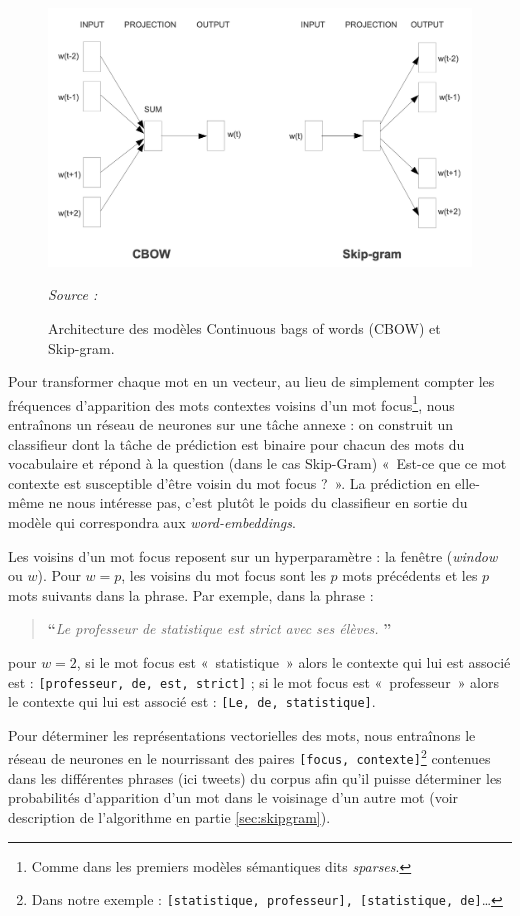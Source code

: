 \documentclass[11pt,french,french]{article}
\let\rmarkdownfootnote\footnote%
\def\footnote{\protect\rmarkdownfootnote}
\begin{document}
\begin{figure}[htp]
\centering
\includegraphics[width=.6\textwidth]{img/cbow_skip_gram.png}
\captionsetup{margin=0cm,format=hang,justification=justified}
\caption{Architecture des modèles Continuous bags of words (CBOW) et Skip-gram.}\label{fig:cbowskipgram}
\footnotesize
\emph{Source : \cite{Mikolov}}
\end{figure}

Pour transformer chaque mot en un vecteur, au lieu de simplement compter les fréquences d'apparition des mots contextes voisins d'un mot focus\footnote{Comme dans les premiers modèles sémantiques dits \emph{sparses}.}, nous entraînons un réseau de neurones sur une tâche annexe : on construit un classifieur dont la tâche de prédiction est binaire pour chacun des mots du vocabulaire et répond à la question (dans le cas Skip-Gram) «~Est-ce que ce mot contexte est susceptible d'être voisin du mot focus ?~».
La prédiction en elle-même ne nous intéresse pas, c'est plutôt le poids du classifieur en sortie du modèle qui correspondra aux \emph{word-embeddings}.

Les voisins d'un mot focus reposent sur un hyperparamètre : la fenêtre (\emph{window} ou \(w\)).
Pour \(w = p\), les voisins du mot focus sont les \(p\) mots précédents et les \(p\) mots suivants dans la phrase. Par exemple, dans la phrase :

\begin{quote}
\LARGE \textbf{``}\normalsize \emph{Le professeur de statistique est strict avec ses élèves.} \LARGE \textbf{''}\normalsize
\end{quote}

pour \(w=2\), si le mot focus est «~statistique~» alors le contexte qui lui est associé est : \texttt{{[}professeur,\ de,\ est,\ strict{]}} ; si le mot focus est «~professeur~» alors le contexte qui lui est associé est : \texttt{{[}Le,\ de,\ statistique{]}}.

Pour déterminer les représentations vectorielles des mots, nous entraînons le réseau de neurones en le nourrissant des paires \texttt{{[}focus,\ contexte{]}}\footnote{Dans notre exemple : \texttt{{[}statistique,\ professeur{]},\ {[}statistique,\ de{]}}\dots} contenues dans les différentes phrases (ici tweets) du corpus afin qu'il puisse déterminer les probabilités d'apparition d'un mot dans le voisinage d'un autre mot (voir description de l'algorithme en partie \ref{sec:skipgram}).
\end{document}
